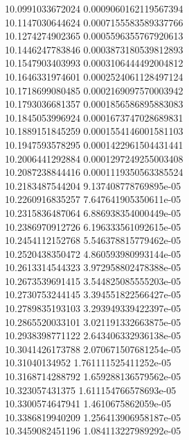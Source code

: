{10.0991033672024 0.0009060162119567394 \\
10.1147030644624 0.0007155583589337766 \\
10.1274274902365 0.0005596355767920613 \\
10.1446247783846 0.0003873180539812893 \\
10.1547903403993 0.0003106444492004812 \\
10.1646331974601 0.0002524061128497124 \\
10.1718699080485 0.0002169097570003942 \\
10.1793036681357 0.0001856586895883083 \\
10.1845053996924 0.0001673747028689831 \\
10.1889151845259 0.0001554146001581103 \\
10.1947593578295 0.0001422961504431441 \\
10.2006441292884 0.0001297249255003408 \\
10.2087238844416 0.0001119350563385524 \\
10.2183487544204 9.137408778769895e-05 \\
10.2260916835257 7.647641905350611e-05 \\
10.2315836487064 6.886938354000449e-05 \\
10.2386970912726 6.196333561092615e-05 \\
10.2454112152768 5.546378815779462e-05 \\
10.2520438350472 4.860593980993144e-05 \\
10.2613314544323 3.972958802478388e-05 \\
10.2673539691415 3.544825085555203e-05 \\
10.2730753244145 3.394551822566427e-05 \\
10.2789835193103 3.293949339422397e-05 \\
10.2865520033101 3.021191332663875e-05 \\
10.2938398771122 2.643406332936138e-05 \\
10.3041426173788 2.070671507681254e-05 \\
10.31040134952 1.761111525411252e-05 \\
10.3168714288792 1.659288136579562e-05 \\
10.323057431375 1.611154766578693e-05 \\
10.3300574647941 1.4610675862059e-05 \\
10.3386819940209 1.256413906958187e-05 \\
10.3459082451196 1.084113227989292e-05 \\
}
